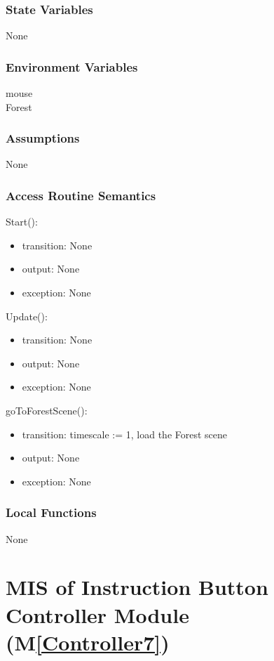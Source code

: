 \documentclass[12pt, titlepage]{article}
\newcommand{\mref}[1]{M\ref{#1}}
\begin{document}
\subsubsection{State Variables}
None

\subsubsection{Environment Variables}
mouse\\
Forest

\subsubsection{Assumptions}

None
\subsubsection{Access Routine Semantics}

\noindent Start():
\begin{itemize}
\item transition: None 
\item output: None
\item exception: None
\end{itemize}
\noindent Update():
\begin{itemize}
\item transition: None 
\item output: None
\item exception: None
\end{itemize}
\noindent goToForestScene():
\begin{itemize}
\item transition: timescale := 1, load the Forest scene
\item output: None
\item exception: None
\end{itemize}


\subsubsection{Local Functions}
None

  \newpage
  
 \section{MIS of Instruction Button Controller Module (\mref{Controller7})}
 
\end{document}

